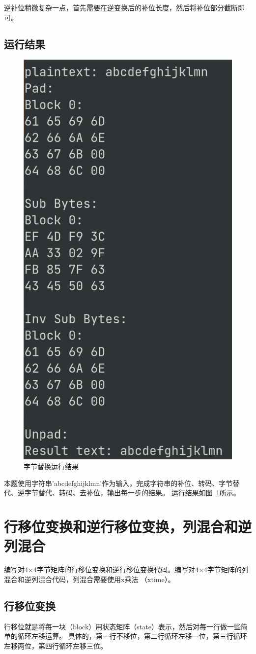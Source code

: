 \documentclass[degree=project,degree-type=project,cjk-font=noto]{thuthesis}
\begin{document}
逆补位稍微复杂一点，首先需要在逆变换后的补位长度，然后将补位部分截断即可。

\subsection{运行结果}

\begin{figure}[h]
\centering%
\includegraphics[width=.4\linewidth]{aes_t1.png}
  \caption{字节替换运行结果}
  \label{fig:t1}
\end{figure}

本题使用字符串'abcdefghijklmn'作为输入，完成字符串的补位、转码、字节替代、逆字节替代、转码、去补位，输出每一步的结果。
运行结果如图~\ref{fig:t1}所示。

\section{行移位变换和逆行移位变换，列混合和逆列混合}

编写对4×4字节矩阵的行移位变换和逆行移位变换代码。编写对4×4字节矩阵的列混合和逆列混合代码，列混合需要使用x乘法 （xtime）。

\subsection{行移位变换}

行移位就是将每一块（block）用状态矩阵（state）表示，然后对每一行做一些简单的循环左移运算。
具体的，第一行不移位，第二行循环左移一位，第三行循环左移两位，第四行循环左移三位。
\end{document}
